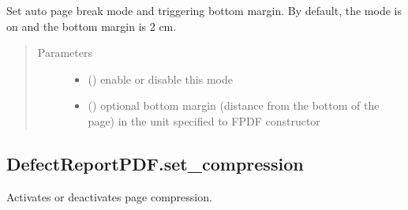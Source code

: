 \documentclass[letterpaper,10pt,english]{sphinxmanual}
\begin{document}
\begin{fulllineitems}
\begin{fulllineitems}
\label{\detokenize{generated/quality_assessment.quality_pdf_report.DefectReportPDF.set_auto_page_break:quality_assessment.quality_pdf_report.DefectReportPDF.set_auto_page_break}}
\sphinxAtStartPar
Set auto page break mode and triggering bottom margin.
By default, the mode is on and the bottom margin is 2 cm.
\begin{quote}\begin{description}
\item[{Parameters}] \leavevmode\begin{itemize}
\item {} 
\sphinxAtStartPar
{} () \textendash{} enable or disable this mode

\item {} 
\sphinxAtStartPar
{} () \textendash{} optional bottom margin (distance from the bottom of the page)
in the unit specified to FPDF constructor

\end{itemize}

\end{description}\end{quote}

\end{fulllineitems}



\subsection{DefectReportPDF.set\_compression}
\label{\detokenize{generated/quality_assessment.quality_pdf_report.DefectReportPDF.set_compression:defectreportpdf-set-compression}}\label{\detokenize{generated/quality_assessment.quality_pdf_report.DefectReportPDF.set_compression::doc}}

\begin{fulllineitems}
\label{\detokenize{generated/quality_assessment.quality_pdf_report.DefectReportPDF.set_compression:quality_assessment.quality_pdf_report.DefectReportPDF.set_compression}}
\sphinxAtStartPar
Activates or deactivates page compression.


\end{fulllineitems}
\end{fulllineitems}
\end{document}
